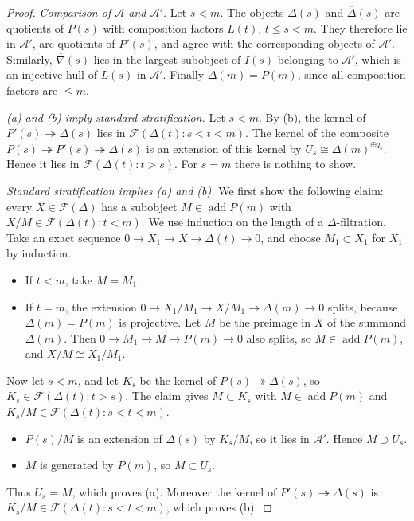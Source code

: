 \documentclass[11pt,reqno]{amsart}
\theoremstyle{plain}
\theoremstyle{definition}
\theoremstyle{remark}
\DeclareMathOperator{\add}{add}
\newcommand{\nablabar}{\overline{\nabla}}
\newcommand{\Deltabar}{\overline{\Delta}}
\newcommand{\cA}{\mathcal{A}}
\newcommand{\cF}{\mathcal{F}}
\begin{document}
\begin{proof}
\emph{Comparison of $\cA$ and $\cA'$.} Let $s<m$. The objects $\Delta(s)$ and $\Deltabar(s)$ are quotients of $P(s)$ with composition factors $L(t)$, $t\le s<m$. They therefore lie in $\cA'$, are quotients of $P'(s)$, and agree with the corresponding objects of $\cA'$. Similarly, $\nablabar(s)$ lies in the largest subobject of $I(s)$ belonging to $\cA'$, which is an injective hull of $L(s)$ in $\cA'$. Finally $\Delta(m)=P(m)$, since all composition factors are $\le m$.

\emph{(a) and (b) imply standard stratification.} Let $s<m$. By (b), the kernel of $P'(s)\twoheadrightarrow\Delta(s)$ lies in $\cF(\Delta(t):s<t<m)$. The kernel of the composite $P(s)\twoheadrightarrow P'(s)\twoheadrightarrow\Delta(s)$ is an extension of this kernel by $U_s\cong\Delta(m)^{\oplus q_s}$. Hence it lies in $\cF(\Delta(t):t>s)$. For $s=m$ there is nothing to show.

\emph{Standard stratification implies (a) and (b).} We first show the following claim: every $X\in\cF(\Delta)$ has a subobject $M\in\add P(m)$ with $X/M\in\cF(\Delta(t):t<m)$. We use induction on the length of a $\Delta$-filtration. Take an exact sequence $0\to X_1\to X\to\Delta(t)\to0$, and choose $M_1\subset X_1$ for $X_1$ by induction.
\begin{itemize}
\item If $t<m$, take $M=M_1$.
\item If $t=m$, the extension $0\to X_1/M_1\to X/M_1\to\Delta(m)\to0$ splits, because $\Delta(m)=P(m)$ is projective. Let $M$ be the preimage in $X$ of the summand $\Delta(m)$. Then $0\to M_1\to M\to P(m)\to0$ also splits, so $M\in\add P(m)$, and $X/M\cong X_1/M_1$.
\end{itemize}
Now let $s<m$, and let $K_s$ be the kernel of $P(s)\twoheadrightarrow\Delta(s)$, so $K_s\in\cF(\Delta(t):t>s)$. The claim gives $M\subset K_s$ with $M\in\add P(m)$ and $K_s/M\in\cF(\Delta(t):s<t<m)$.
\begin{itemize}
\item $P(s)/M$ is an extension of $\Delta(s)$ by $K_s/M$, so it lies in $\cA'$. Hence $M\supset U_s$.
\item $M$ is generated by $P(m)$, so $M\subset U_s$.
\end{itemize}
Thus $U_s=M$, which proves (a). Moreover the kernel of $P'(s)\twoheadrightarrow\Delta(s)$ is $K_s/M\in\cF(\Delta(t):s<t<m)$, which proves (b).
\end{proof}
\end{document}
